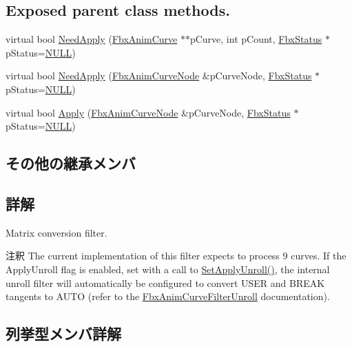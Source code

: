 \subsection*{Exposed parent class methods.}
\begin{DoxyCompactItemize}
\item 
virtual bool \hyperlink{class_fbx_anim_curve_filter_matrix_converter_a7cae8d7e31ab1cf2437de8636a5b4916}{Need\+Apply} (\hyperlink{class_fbx_anim_curve}{Fbx\+Anim\+Curve} $\ast$$\ast$p\+Curve, int p\+Count, \hyperlink{class_fbx_status}{Fbx\+Status} $\ast$p\+Status=\hyperlink{fbxarch_8h_a070d2ce7b6bb7e5c05602aa8c308d0c4}{N\+U\+LL})
\item 
virtual bool \hyperlink{class_fbx_anim_curve_filter_matrix_converter_a00f04a303254479eef1aa3bfbe0643d8}{Need\+Apply} (\hyperlink{class_fbx_anim_curve_node}{Fbx\+Anim\+Curve\+Node} \&p\+Curve\+Node, \hyperlink{class_fbx_status}{Fbx\+Status} $\ast$p\+Status=\hyperlink{fbxarch_8h_a070d2ce7b6bb7e5c05602aa8c308d0c4}{N\+U\+LL})
\item 
virtual bool \hyperlink{class_fbx_anim_curve_filter_matrix_converter_aa71462534eff53b1177aaa5bb3e059ec}{Apply} (\hyperlink{class_fbx_anim_curve_node}{Fbx\+Anim\+Curve\+Node} \&p\+Curve\+Node, \hyperlink{class_fbx_status}{Fbx\+Status} $\ast$p\+Status=\hyperlink{fbxarch_8h_a070d2ce7b6bb7e5c05602aa8c308d0c4}{N\+U\+LL})
\end{DoxyCompactItemize}
\subsection*{その他の継承メンバ}


\subsection{詳解}
Matrix conversion filter.

\begin{DoxyRemark}{注釈}
The current implementation of this filter expects to process 9 curves. If the Apply\+Unroll flag is enabled, set with a call to \hyperlink{class_fbx_anim_curve_filter_matrix_converter_abcfe379526feec5a8d3ffc9e3e435d66}{Set\+Apply\+Unroll()}, the internal unroll filter will automatically be configured to convert U\+S\+ER and B\+R\+E\+AK tangents to A\+U\+TO (refer to the \hyperlink{class_fbx_anim_curve_filter_unroll}{Fbx\+Anim\+Curve\+Filter\+Unroll} documentation). 
\end{DoxyRemark}


\subsection{列挙型メンバ詳解}
\mbox{\label{class_fbx_anim_curve_filter_matrix_converter_a41638d5acd6d14ef0f095ab75b18ee69}} 
